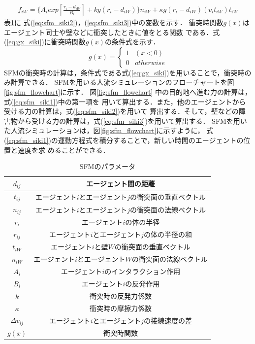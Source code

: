 %
\begin{eqnarray}
 f_{iW} = \{A_i exp[\frac{r_{i} - d_{iW}}{B_i}]
  + kg(r_{i} - d_{iW})\} n_{iW} + \kappa g (r_{i} - d_{iW})
  (v_i t_{iW}) t_{iW}
 \label{eq:sfm_siki3}
\end{eqnarray}
%
表\ref{tab:tab_para}に
式(\ref{eq:sfm_siki2})，(\ref{eq:sfm_siki3})中の変数を示す．
衝突時関数$g(x)$はエージェント同士や壁などに衝突したときに値をとる関数
である．式(\ref{eq:gx_siki})に衝突時関数$g(x)$の条件式を示す．
%
\begin{equation}
  \label{eq:gx_siki}
  g(x) =
  \begin{cases}
    1 & (x<0) \\
    0 & otherwise
  \end{cases}
\end{equation}
%
SFMの衝突時の計算は，条件式である式(\ref{eq:gx_siki})を用いることで，衝突時のみ計算できる．
SFMを用いる人流シミュレーションのフローチャートを図
\ref{fig:sfm_flowchart}に示す．
図\ref{fig:sfm_flowchart} 中の目的地へ進む力の計算は，式(\ref{eq:sfm_siki1})中の第一項を
用いて算出する．また，他のエージェントから受ける力の計算は，式(\ref{eq:sfm_siki2})を用いて
算出する．そして，壁などの障害物から受ける力の計算は，式(\ref{eq:sfm_siki3})を用いて算出する．
SFMを用いた人流シミュレーションは，図\ref{fig:sfm_flowchart}に示すように，
式(\ref{eq:sfm_siki1})の運動方程式を積分することで，新しい時間のエージェントの位置と速度を求
めることができる．

\begin{table}[t]
 \begin{center}
  \caption{SFMのパラメータ}
    \begin{tabular}{c|c}
     \hline \hline
     $d_{ij}$ & エージェント間の距離 \\
     \hline
     $t_{ij}$ & エージェント$i$とエージェント$j$の衝突面の垂直ベクトル \\
     \hline
     $n_{ij}$ & エージェント$i$とエージェント$j$の衝突面の法線ベクトル\\
     \hline
     $r_i$ & エージェント$i$の体の半径 \\
     \hline
     $r_{ij}$ & エージェント$i$とエージェント$j$の体の半径の和 \\
     \hline
     $t_{iW}$ & エージェント$i$と壁$W$の衝突面の垂直ベクトル\\
     \hline
     $n_{iW}$ & エージェント$i$とエージェント$W$の衝突面の法線ベクトル \\
     \hline
     $A_i$ & エージェント$i$のインタラクション作用 \\
     \hline
     $B_i$ & エージェント$i$の反発作用 \\
     \hline
     $k$ & 衝突時の反発力係数\\
     \hline
     $\kappa$ & 衝突時の摩擦力係数 \\
     \hline
     $\Delta v_{ij}$ & エージェント$i$とエージェント$j$の接線速度の差 \\
     \hline
     $g(x)$ & 衝突時関数 \\
     \hline
    \end{tabular}
  \label{tab:tab_para}
 \end{center}
\end{table}


